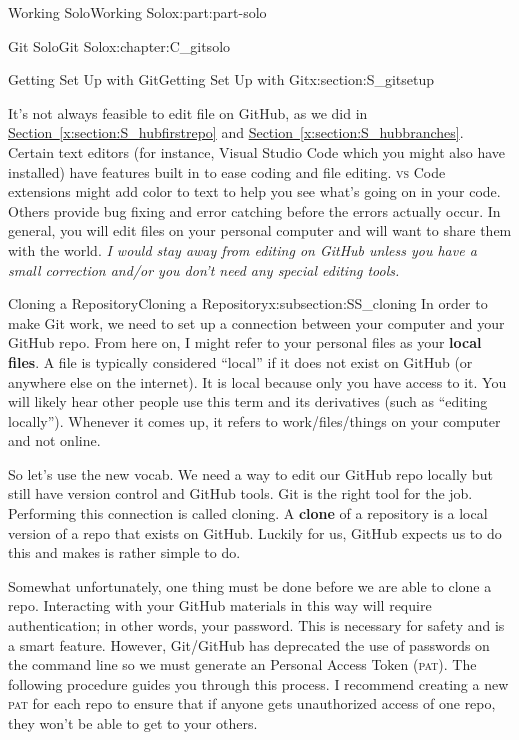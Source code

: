 \documentclass[oneside,10pt,]{book}
\newcommand{\xreffont}{\relax}
\newcommand{\initialism}[1]{\textsc{\MakeLowercase{#1}}}
\newcommand{\acronym}[1]{\textsc{\MakeLowercase{#1}}}
\newcommand{\terminology}[1]{\textbf{#1}}
\begin{document}
\begin{partptx}{Working Solo}{}{Working Solo}{}{}{x:part:part-solo}
\begin{chapterptx}{Git Solo}{}{Git Solo}{}{}{x:chapter:C_gitsolo}
\begin{sectionptx}{Getting Set Up with Git}{}{Getting Set Up with Git}{}{}{x:section:S_gitsetup}
\begin{introduction}{}
\par
It's not always feasible to edit file on GitHub, as we did in \hyperref[x:section:S_hubfirstrepo]{Section~{\xreffont\ref{x:section:S_hubfirstrepo}}} and \hyperref[x:section:S_hubbranches]{Section~{\xreffont\ref{x:section:S_hubbranches}}}. Certain text editors (for instance, Visual Studio Code which you might also have installed) have features built in to ease coding and file editing. \initialism{VS} Code extensions might add color to text to help you see what's going on in your code. Others provide bug fixing and error catching before the errors actually occur. In general, you will edit files on your personal computer and will want to share them with the world. \emph{I would stay away from editing on GitHub unless you have a small correction and\slash{}or you don't need any special editing tools.}%
\end{introduction}%
%
%
\typeout{************************************************}
\typeout{************************************************}
%
\begin{subsectionptx}{Cloning a Repository}{}{Cloning a Repository}{}{}{x:subsection:SS_cloning}
%
%
%
%
%
In order to make Git work, we need to set up a connection between your computer and your GitHub repo. From here on, I might refer to your personal files as your \terminology{local files}. A file is typically considered ``local'' if it does not exist on GitHub (or anywhere else on the internet). It is local because only you have access to it. You will likely hear other people use this term and its derivatives (such as ``editing locally''). Whenever it comes up, it refers to work\slash{}files\slash{}things on your computer and not online.%
\par
So let's use the new vocab. We need a way to edit our GitHub repo locally but still have version control and GitHub tools. Git is the right tool for the job. Performing this connection is called cloning. A \terminology{clone} of a repository is a local version of a repo that exists on GitHub. Luckily for us, GitHub expects us to do this and makes is rather simple to do.%
\par
Somewhat unfortunately, one thing must be done before we are able to clone a repo. Interacting with your GitHub materials in this way will require authentication; in other words, your password. This is necessary for safety and is a smart feature. However, Git\slash{}GitHub has deprecated the use of passwords on the command line so we must generate an Personal Access Token (\acronym{PAT}). The following procedure guides you through this process. I recommend creating a new \acronym{PAT} for each repo to ensure that if anyone gets unauthorized access of one repo, they won't be able to get to your others.%

\end{subsectionptx}
\end{sectionptx}
\end{chapterptx}
\end{partptx}
\end{document}
